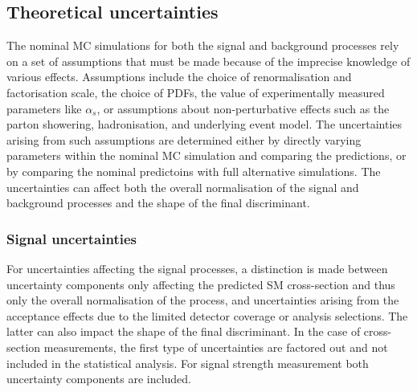 \subsection{Theoretical uncertainties}
The nominal MC simulations for both the signal and background processes rely on a set of assumptions that must be made because of the imprecise knowledge of various effects. Assumptions include the choice of renormalisation and factorisation scale, the choice of PDFs, the value of experimentally measured parameters like $\alpha_s$, or assumptions about non-perturbative effects such as the parton showering, hadronisation, and underlying event model. 
The uncertainties arising from such assumptions are determined either by directly varying parameters within the nominal MC simulation and comparing the predictions, or by comparing the nominal predictoins with full alternative simulations. 
The uncertainties can affect both the overall normalisation of the signal and background processes and the shape of the final discriminant.  

\subsubsection{Signal uncertainties}
For uncertainties affecting the signal processes, a distinction is made between uncertainty components only affecting the predicted SM cross-section and thus only the overall normalisation of the process, and uncertainties arising from the acceptance effects due to the limited detector coverage or analysis selections. The latter can also impact the shape of the final discriminant. 
In the case of cross-section measurements, the first type of uncertainties are factored out and not included in the statistical analysis. For signal strength measurement both uncertainty components are included. 

